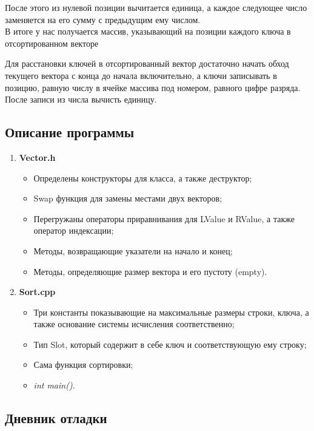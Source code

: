 \documentclass[12pt]{article}
\begin{document}
После этого из нулевой позиции вычитается единица, а каждое следующее число заменяется на его сумму с предыдущим ему числом.\\
В итоге у нас получается массив, указывающий на позиции каждого ключа в отсортированном векторе

Для расстановки ключей в отсортированный вектор достаточно начать обход текущего вектора с конца до начала включительно, а ключи записывать в позицию, равную числу в ячейке массива под номером, равного цифре разряда. После записи из числа вычисть единицу.

\subsection*{Описание программы}

\begin{enumerate}
\item \textbf{Vector.h}
	\begin{itemize}
	Определяет шаблонный вектор класс
		\item Определены конструкторы для класса, а также деструктор;
		\item Swap функция для замены местами двух векторов;
		\item Перегружаны операторы приравнивания для LValue и RValue, а также оператор индексации;
		\item Методы, возвращающие указатели на начало и конец;
		\item Методы, определяющие размер вектора и его пустоту (empty).
	\end{itemize}
\item \textbf{Sort.cpp}
	\begin{itemize}
		\item Три константы показывающие на максимальные размеры строки, ключа, а также основание системы исчисления соответственно;
		\item Тип Slot, который содержит в себе ключ и соответствующую ему строку;
		\item Сама функция сортировки;
		\item \textit{int main()}.
	\end{itemize}
\end{enumerate}

\subsection*{Дневник отладки}
\end{document}
